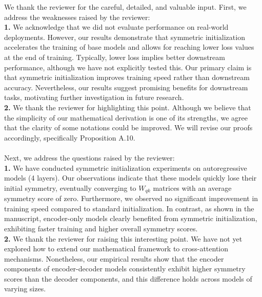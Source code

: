 \documentclass[11pt]{article}
\begin{document}
We thank the reviewer for the careful, detailed, and valuable input. First, we address the weaknesses raised by the reviewer:
%
\\
%
\textbf{1.} We acknowledge that we did not evaluate performance on real-world deployments. However, our results demonstrate that symmetric initialization accelerates the training of base models and allows for reaching lower loss values at the end of training. Typically, lower loss implies better downstream performance, although we have not explicitly tested this. Our primary claim is that symmetric initialization improves training speed rather than downstream accuracy. Nevertheless, our results suggest promising benefits for downstream tasks, motivating further investigation in future research.
%
\\
%
\textbf{2.} We thank the reviewer for highlighting this point. Although we believe that the simplicity of our mathematical derivation is one of its strengths, we agree that the clarity of some notations could be improved. We will revise our proofs accordingly, specifically Proposition A.10.
%
\\\\
%
Next, we address the questions raised by the reviewer:
%
\\
%
\textbf{1.} We have conducted symmetric initialization experiments on autoregressive models (4 layers). Our observations indicate that these models quickly lose their initial symmetry, eventually converging to $W_{qk}$ matrices with an average symmetry score of zero. Furthermore, we observed no significant improvement in training speed compared to standard initialization. In contrast, as shown in the manuscript, encoder-only models clearly benefited from symmetric initialization, exhibiting faster training and higher overall symmetry scores.
%
\\
%
\textbf{2.} We thank the reviewer for raising this interesting point. We have not yet explored how to extend our mathematical framework to cross-attention mechanisms. 
Nonetheless, our empirical results show that the encoder components of encoder-decoder models consistently exhibit higher symmetry scores than the decoder components, and this difference holds across models of varying sizes. 
\end{document}
